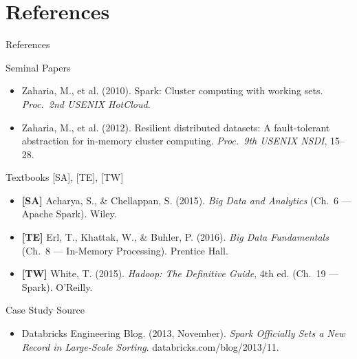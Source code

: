 \documentclass[aspectratio=169,10pt]{beamer}
\begin{document}
\section*{References}

\begin{frame}{References}
  \begin{block}{Seminal Papers}
    \begin{itemize}
      \item Zaharia, M., et al. (2010).
            Spark: Cluster computing with working sets.
            \textit{Proc.\ 2nd USENIX HotCloud}.
      \item Zaharia, M., et al. (2012).
            Resilient distributed datasets: A fault-tolerant abstraction
            for in-memory cluster computing.
            \textit{Proc.\ 9th USENIX NSDI}, 15--28.
    \end{itemize}
  \end{block}
  \vspace{4pt}
  \begin{block}{Textbooks \textmd{[SA], [TE], [TW]}}
    \begin{itemize}
      \item \textbf{[SA]} Acharya, S., \& Chellappan, S. (2015).
            \textit{Big Data and Analytics}
            (Ch.~6 — Apache Spark). Wiley.
      \item \textbf{[TE]} Erl, T., Khattak, W., \& Buhler, P. (2016).
            \textit{Big Data Fundamentals}
            (Ch.~8 — In-Memory Processing). Prentice Hall.
      \item \textbf{[TW]} White, T. (2015).
            \textit{Hadoop: The Definitive Guide}, 4th ed.
            (Ch.~19 — Spark). O'Reilly.
    \end{itemize}
  \end{block}
  \vspace{4pt}
  \begin{block}{Case Study Source}
    \begin{itemize}
      \item Databricks Engineering Blog. (2013, November).
            \textit{Spark Officially Sets a New Record in Large-Scale
            Sorting}. databricks.com/blog/2013/11.
    \end{itemize}
  \end{block}
\end{frame}
\end{document}
